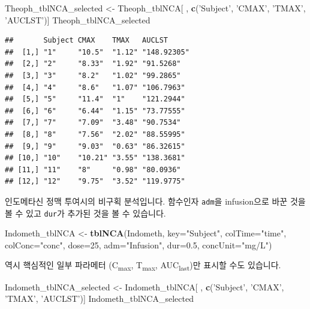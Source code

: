 \documentclass[9pt,]{krantz}
\newenvironment{Shaded}{\begin{snugshade}}{\end{snugshade}}
\newcommand{\KeywordTok}[1]{\textcolor[rgb]{0.13,0.29,0.53}{\textbf{#1}}}
\newcommand{\DataTypeTok}[1]{\textcolor[rgb]{0.13,0.29,0.53}{#1}}
\newcommand{\DecValTok}[1]{\textcolor[rgb]{0.00,0.00,0.81}{#1}}
\newcommand{\FloatTok}[1]{\textcolor[rgb]{0.00,0.00,0.81}{#1}}
\newcommand{\StringTok}[1]{\textcolor[rgb]{0.31,0.60,0.02}{#1}}
\newcommand{\NormalTok}[1]{#1}
\begin{document}
\begin{Shaded}
\begin{Highlighting}[]
\NormalTok{Theoph_tblNCA_selected <-}\StringTok{ }\NormalTok{Theoph_tblNCA[ , }\KeywordTok{c}\NormalTok{(}\StringTok{'Subject'}\NormalTok{, }\StringTok{'CMAX'}\NormalTok{, }\StringTok{'TMAX'}\NormalTok{, }\StringTok{'AUCLST'}\NormalTok{)]}
\NormalTok{Theoph_tblNCA_selected}
\end{Highlighting}
\end{Shaded}

\begin{verbatim}
##       Subject CMAX    TMAX   AUCLST     
##  [1,] "1"     "10.5"  "1.12" "148.92305"
##  [2,] "2"     "8.33"  "1.92" "91.5268"  
##  [3,] "3"     "8.2"   "1.02" "99.2865"  
##  [4,] "4"     "8.6"   "1.07" "106.7963" 
##  [5,] "5"     "11.4"  "1"    "121.2944" 
##  [6,] "6"     "6.44"  "1.15" "73.77555" 
##  [7,] "7"     "7.09"  "3.48" "90.7534"  
##  [8,] "8"     "7.56"  "2.02" "88.55995" 
##  [9,] "9"     "9.03"  "0.63" "86.32615" 
## [10,] "10"    "10.21" "3.55" "138.3681" 
## [11,] "11"    "8"     "0.98" "80.0936"  
## [12,] "12"    "9.75"  "3.52" "119.9775"
\end{verbatim}

인도메타신 정맥 투여시의 비구획 분석입니다. 함수인자 \texttt{adm}을
infusion으로 바꾼 것을 볼 수 있고 \texttt{dur}가 추가된 것을 볼 수
있습니다.

\begin{Shaded}
\begin{Highlighting}[]
\NormalTok{Indometh_tblNCA <-}\StringTok{ }\KeywordTok{tblNCA}\NormalTok{(Indometh, }\DataTypeTok{key=}\StringTok{"Subject"}\NormalTok{, }\DataTypeTok{colTime=}\StringTok{"time"}\NormalTok{, }\DataTypeTok{colConc=}\StringTok{"conc"}\NormalTok{, }\DataTypeTok{dose=}\DecValTok{25}\NormalTok{, }
       \DataTypeTok{adm=}\StringTok{"Infusion"}\NormalTok{, }\DataTypeTok{dur=}\FloatTok{0.5}\NormalTok{, }\DataTypeTok{concUnit=}\StringTok{"mg/L"}\NormalTok{)}
\end{Highlighting}
\end{Shaded}

역시 핵심적인 일부 파라메터 (C\textsubscript{max}, T\textsubscript{max},
AUC\textsubscript{last})만 표시할 수도 있습니다.

\begin{Shaded}
\begin{Highlighting}[]
\NormalTok{Indometh_tblNCA_selected <-}\StringTok{ }\NormalTok{Indometh_tblNCA[ , }\KeywordTok{c}\NormalTok{(}\StringTok{'Subject'}\NormalTok{, }\StringTok{'CMAX'}\NormalTok{, }\StringTok{'TMAX'}\NormalTok{, }\StringTok{'AUCLST'}\NormalTok{)]}
\NormalTok{Indometh_tblNCA_selected}
\end{Highlighting}
\end{Shaded}
\end{document}
